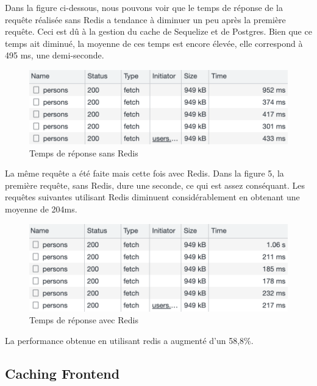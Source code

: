 Dans la figure ci-dessous, nous pouvons voir que le temps de réponse de la requête réalisée sans Redis a tendance à diminuer un peu après la première requête. Ceci est dû à la gestion du cache de Sequelize et de Postgres. Bien que ce temps ait diminué, la moyenne de ces temps est encore élevée, elle correspond à 495 ms, une demi-seconde.
\begin{figure}[H]
    \centering
    \includegraphics[width=\linewidth]{img/sans-redis.png}
    \caption{Temps de réponse sans Redis}
    \label{Sans-Redis}
  \end{figure}
La même requête a été faite mais cette fois avec Redis. Dans la figure 5, la première requête, sans Redis, dure une seconde, ce qui est assez conséquant. Les requêtes suivantes utilisant Redis diminuent considérablement en obtenant une moyenne de 204ms.
\begin{figure}[H]
    \centering
    \includegraphics[width=\linewidth]{img/avec-redis.png}
    \caption{Temps de réponse avec Redis}
    \label{Avec-Redis}
\end{figure}
La performance obtenue en utilisant redis a augmenté d'un 58,8\%.

\subsection{Caching Frontend}